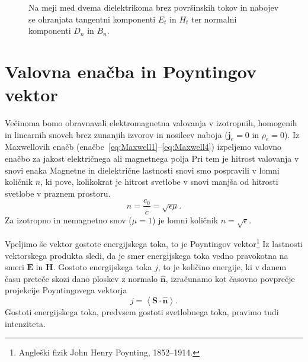 \begin{figure}[h]
\centering
  \def\svgwidth{75truemm} 
  
\caption{Na meji med dvema dielektrikoma brez površinskih tokov
in nabojev se ohranjata tangentni komponenti $E_t$ in $H_t$ ter 
normalni komponenti $D_n$ in $B_n$.}
\label{fig:Robni-pogoji}
\end{figure}

\section{Valovna enačba in Poyntingov vektor}
Večinoma bomo obravnavali elektromagnetna valovanja v izotropnih, 
homogenih in linearnih snoveh brez zunanjih izvorov in
nosilcev naboja ($\mathbf{j}_e=0$ in $\rho_{e}=0$). 
Iz Maxwellovih enačb (enačbe~\ref{eq:Maxwell1}--\ref{eq:Maxwell4}) izpeljemo valovno 
enačbo za jakost električnega ali magnetnega polja 
Pri tem je hitrost valovanja v snovi enaka 
Magnetne in dielektrične lastnosti snovi smo pospravili
v lomni količnik $n$, ki pove, kolikokrat je hitrost svetlobe v snovi manjša
od hitrosti svetlobe v praznem prostoru.
\begin{equation}
n=\frac{c_{0}}{c}=\sqrt{\epsilon\mu}.
\end{equation}
Za izotropno in nemagnetno snov ($\mu=1$) je lomni količnik $n=\sqrt{\epsilon}$.

Vpeljimo še vektor gostote energijskega toka, to je Poyntingov vektor\footnote{Angleški 
fizik John Henry Poynting, 1852--1914.} 
Iz lastnosti vektorskega produkta sledi, da je smer energijskega toka vedno pravokotna na 
smeri $\mathbf{E}$ in $\mathbf{H}$. Gostoto energijskega toka $j$, to je količino
energije, ki v danem času preteče skozi dano ploskev
z normalo $\mathbf{\hat{n}}$, izračunamo kot časovno povprečje projekcije
Poyntingovega vektorja 
\begin{equation}
j=\left\langle \mathbf{\mathbf{S}}\cdot\mathbf{\hat{n}}\right\rangle.
\end{equation}
Gostoti energijskega toka, predvsem gostoti svetlobnega toka, pravimo tudi 
intenziteta.

